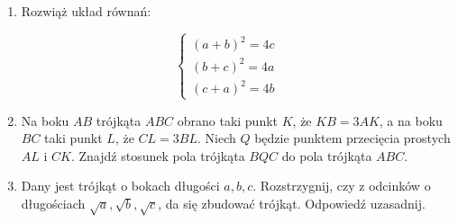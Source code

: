 \documentclass[10pt]{article}
\begin{document}
\begin{enumerate}
  \item Rozwiąż układ równań:
\end{enumerate}

\[
\left\{\begin{array}{l}
(a+b)^{2}=4 c \\
(b+c)^{2}=4 a \\
(c+a)^{2}=4 b
\end{array}\right.
\]

\begin{enumerate}
  \setcounter{enumi}{1}
  \item Na boku \(A B\) trójkąta \(A B C\) obrano taki punkt \(K\), że \(K B=3 A K\), a na boku \(B C\) taki punkt \(L\), że \(C L=3 B L\). Niech \(Q\) będzie punktem przecięcia prostych \(A L\) i \(C K\). Znajdź stosunek pola trójkąta \(B Q C\) do pola trójkąta \(A B C\).
  \item Dany jest trójkąt o bokach długości \(a, b, c\). Rozstrzygnij, czy z odcinków o długościach \(\sqrt{a}, \sqrt{b}, \sqrt{c}\), da się zbudować trójkąt. Odpowiedź uzasadnij.
\end{enumerate}
\end{document}
